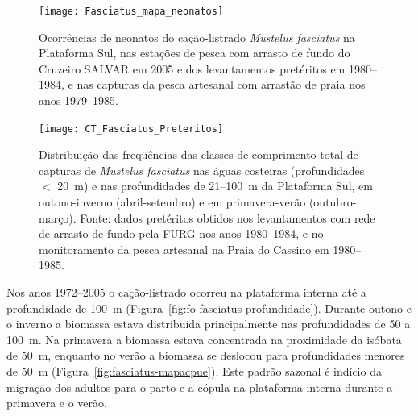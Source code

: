 \documentclass[a4paper,11pt,twoside,showtrims,onecolumn,openright,final]{memoir}
\begin{document}
\begin{figure}
\begin{center}
\texttt{[image: Fasciatus\_mapa\_neonatos]}
\end{center}
\caption[Ocorrências de neonatos do cação-listrado \emph{Mustelus fasciatus}  na Plataforma Sul]
	{Ocorrências de neonatos do cação-listrado \emph{Mustelus fasciatus}  na Plataforma Sul, 
         nas estações de pesca com arrasto de fundo do Cruzeiro SALVAR em 2005 e dos levantamentos 
         pretéritos em 1980--1984, e nas capturas da pesca artesanal com arrastão de praia nos anos 1979--1985.}
\label{fig:fasciatus-mapa-neonatos}
\end{figure}


%
%

\begin{figure}
\begin{center}
\texttt{[image: CT\_Fasciatus\_Preteritos]}
\end{center}
\caption[Distribuição das freqüências das classes de comprimento total de capturas de \emph{Mustelus fasciatus} 
         nas águas costeiras e nas profundidades de 21--100~m da Plataforma Sul]
	{Distribuição das freqüências das classes de comprimento total de capturas de \emph{Mustelus fasciatus} 
         nas águas costeiras (profundidades $<$  20~m) e nas profundidades de 21--100~m da Plataforma Sul, 
         em outono-inverno (abril-setembro) e em primavera-verão (outubro-março).    
         Fonte: dados pretéritos obtidos nos levantamentos com rede de arrasto de fundo 
         pela FURG nos anos 1980--1984, e no monitoramento da pesca artesanal 
         na Praia do Cassino em 1980--1985.}
\label{fig:fasciatus-ct-preteritos} %
\end{figure}


Nos anos 1972--2005 o cação-listrado ocorreu na plataforma interna até 
a profundidade de 100~m (Figura~\ref{fig:fo-fasciatus-profundidade}). 
Durante outono e o inverno a biomassa estava distribuída principalmente nas profundidades de 50 a 100~m. 
Na primavera a biomassa estava concentrada na proximidade da isóbata de 50~m, enquanto no verão a biomassa 
se deslocou para  profundidades menores de 50~m (Figura~\ref{fig:fasciatus-mapacpue}). 
Este padrão sazonal é indício da migração dos adultos para o parto e a cópula na plataforma 
interna durante a primavera e o verão. 
\end{document}
